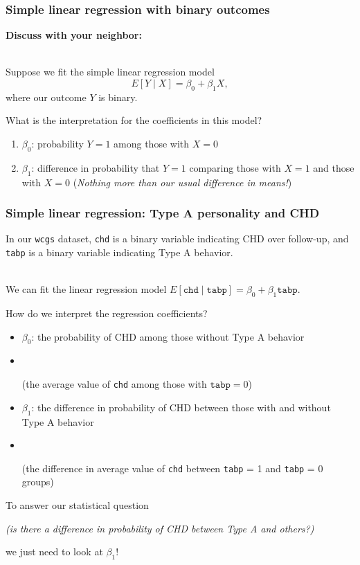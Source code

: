 \documentclass[10pt,t]{beamer}
\begin{document}
\begin{frame}
	\frametitle{Simple linear regression with binary outcomes}
	\textbf{Discuss with your neighbor:} 
	\\ ~\ 
	
	Suppose we fit the simple linear regression model $$E[Y \mid X] = \beta_0 + \beta_1 X,$$ where our outcome $Y$ is binary.
	
	What is the interpretation for the coefficients in this model?
	
	\begin{enumerate}
		\item $\beta_0$: probability $Y = 1$ among those with $X = 0$
		\item $\beta_1$: difference in probability that $Y = 1$ comparing those with $X = 1$ and those with $X = 0$ \footnotesize{(\textit{Nothing more than our usual difference in means!})}
	\end{enumerate} 
\end{frame}

\begin{frame}
	\frametitle{Simple linear regression: Type A personality and CHD}
	
	In our \texttt{wcgs} dataset, \texttt{chd} is a binary variable indicating CHD over follow-up, and \texttt{tabp} is a binary variable indicating Type A behavior. 
	\\ ~\
	
	We can fit the linear regression model $E[\texttt{chd} \mid \texttt{tabp}] = \beta_0 + \beta_1\texttt{tabp} $.
	
	How do we interpret the regression coefficients? \vspace{0.3cm}
	
	\begin{itemize}
		\item \color{blue} $\beta_0$:   the probability of CHD among those without Type A behavior   \color{black}\vspace{-0.2cm}
		\item[] \ \ \begin{scriptsize} (the average value of \texttt{chd} among those with $\texttt{tabp} = 0$) \end{scriptsize}  
		\item \color{blue} $\beta_1$:   the difference in probability of CHD between those with and without Type A behavior   \color{black} \vspace{-0.2cm}
		\item[] \ \ \begin{scriptsize}(the difference in average value of \texttt{chd} between \texttt{tabp} = 1 and \texttt{tabp} = 0 groups)   \end{scriptsize}
	\end{itemize} 
	
	\vspace{0.3cm}
	To answer our statistical question \begin{small}\textit{(is there a difference in probability of CHD between Type A and others?)}\end{small} we just need to look at $\beta_1$!
\end{frame}
\end{document}
